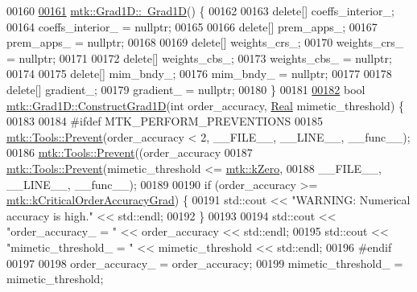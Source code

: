 \begin{DoxyCode}
00160 
\hypertarget{mtk__grad__1d_8cc_source_l00161}{}\hyperlink{classmtk_1_1Grad1D_a2f9b1d306c0f09f36145bb1e7e486b54}{00161} \hyperlink{classmtk_1_1Grad1D_a2f9b1d306c0f09f36145bb1e7e486b54}{mtk::Grad1D::~Grad1D}() \{
00162 
00163   \textcolor{keyword}{delete}[] coeffs\_interior\_;
00164   coeffs\_interior\_ = \textcolor{keyword}{nullptr};
00165 
00166   \textcolor{keyword}{delete}[] prem\_apps\_;
00167   prem\_apps\_ = \textcolor{keyword}{nullptr};
00168 
00169   \textcolor{keyword}{delete}[] weights\_crs\_;
00170   weights\_crs\_ = \textcolor{keyword}{nullptr};
00171 
00172   \textcolor{keyword}{delete}[] weights\_cbs\_;
00173   weights\_cbs\_ = \textcolor{keyword}{nullptr};
00174 
00175   \textcolor{keyword}{delete}[] mim\_bndy\_;
00176   mim\_bndy\_ = \textcolor{keyword}{nullptr};
00177 
00178   \textcolor{keyword}{delete}[] gradient\_;
00179   gradient\_ = \textcolor{keyword}{nullptr};
00180 \}
00181 
\hypertarget{mtk__grad__1d_8cc_source_l00182}{}\hyperlink{classmtk_1_1Grad1D_a74ef5245cfae6fd158bd7f563a0c2e52}{00182} \textcolor{keywordtype}{bool} \hyperlink{classmtk_1_1Grad1D_a74ef5245cfae6fd158bd7f563a0c2e52}{mtk::Grad1D::ConstructGrad1D}(\textcolor{keywordtype}{int} order\_accuracy, 
      \hyperlink{group__c01-roots_gac080bbbf5cbb5502c9f00405f894857d}{Real} mimetic\_threshold) \{
00183 
00184 \textcolor{preprocessor}{  #ifdef MTK\_PERFORM\_PREVENTIONS}
00185   \hyperlink{classmtk_1_1Tools_a332324c6f25e66be9dff48c5987a3b9f}{mtk::Tools::Prevent}(order\_accuracy < 2, \_\_FILE\_\_, \_\_LINE\_\_, \_\_func\_\_);
00186   \hyperlink{classmtk_1_1Tools_a332324c6f25e66be9dff48c5987a3b9f}{mtk::Tools::Prevent}((order\_accuracy%
00187   \hyperlink{classmtk_1_1Tools_a332324c6f25e66be9dff48c5987a3b9f}{mtk::Tools::Prevent}(mimetic\_threshold <= \hyperlink{group__c01-roots_ga59a451a5fae30d59649bcda274fea271}{mtk::kZero},
00188                       \_\_FILE\_\_, \_\_LINE\_\_, \_\_func\_\_);
00189 
00190   \textcolor{keywordflow}{if} (order\_accuracy >= \hyperlink{group__c01-roots_ga295dd2f403c775ecd942c22b5a777496}{mtk::kCriticalOrderAccuracyGrad}) \{
00191     std::cout << \textcolor{stringliteral}{"WARNING: Numerical accuracy is high."} << std::endl;
00192   \}
00193 
00194   std::cout << \textcolor{stringliteral}{"order\_accuracy\_ = "} << order\_accuracy << std::endl;
00195   std::cout << \textcolor{stringliteral}{"mimetic\_threshold\_ = "} << mimetic\_threshold << std::endl;
00196 \textcolor{preprocessor}{  #endif}
00197 
00198   order\_accuracy\_ = order\_accuracy;
00199   mimetic\_threshold\_ = mimetic\_threshold;

\end{DoxyCode}
